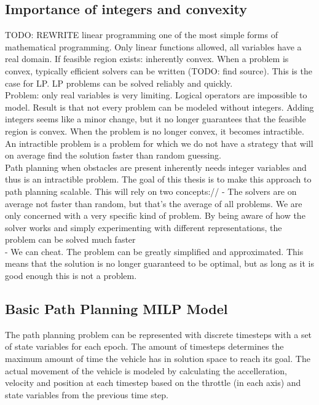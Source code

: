 \subsection{Importance of integers and convexity}
TODO: REWRITE
linear programming one of the most simple forms of mathematical programming. Only linear functions allowed, all variables have a real domain. If feasible region exists: inherently convex. When a problem is convex, typically efficient solvers can be written (TODO: find source). This is the case for LP. LP problems can be solved reliably and quickly.
\\
Problem: only real variables is very limiting. Logical operators are impossible to model. Result is that not every problem can be modeled without integers. Adding integers seems like a minor change, but it no longer guarantees that the feasible region is convex. When the problem is no longer convex, it becomes intractible. An intractible problem is a problem for which we do not have a strategy that will on average find the solution faster than random guessing.
\\
Path planning when obstacles are present inherently needs integer variables and thus is an intractible problem. The goal of this thesis is to make this approach to path planning scalable. This will rely on two concepts://
- The solvers are on average not faster than random, but that's the average of all problems. We are only concerned with a very specific kind of problem. By being aware of how the solver works and simply experimenting with different representations, the problem can be solved much faster\\
- We can cheat. The problem can be greatly simplified and approximated. This means that the solution is no longer guaranteed to be optimal, but as long as it is good enough this is not a problem.\\


\subsection{Basic Path Planning MILP Model}

The path planning problem can be represented with discrete timesteps with a set of state variables for each epoch. The amount of timesteps determines the maximum amount of time the vehicle has in solution space to reach its goal. The actual movement of the vehicle is modeled by calculating the accelleration, velocity and position at each timestep based on the throttle (in each axis) and state variables from the previous time step.


